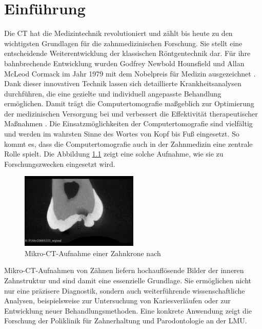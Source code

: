\chapter{Einführung}
\label{chap:einleitung} Die \ac{CT} hat die Medizintechnik revolutioniert und
zählt bis heute zu den wichtigsten Grundlagen für die zahnmedizinischen
Forschung. Sie stellt eine entscheidende Weiterentwicklung der klassischen Röntgentechnik
dar. Für ihre bahnbrechende Entwicklung wurden Godfrey Newbold Hounsfield und
Allan McLeod Cormack im Jahr 1979 mit dem Nobelpreis für Medizin ausgezeichnet
\citep[vgl.][S.~12]{handels2000}. Dank dieser innovativen Technik lassen sich
detaillierte Krankheitsanalysen durchführen, die eine gezielte und individuell angepasste
Behandlung ermöglichen. Damit trägt die Computertomografie maßgeblich zur
Optimierung der medizinischen Versorgung bei und verbessert die Effektivität
therapeutischer Maßnahmen \citep[vgl.][S.~207]{de20083d}. Die
Einsatzmöglichkeiten der Computertomografie sind vielfältig und werden im
wahrsten Sinne des Wortes von Kopf bis Fuß eingesetzt. So kommt es, dass die
Computertomografie auch in der Zahnmedizin eine zentrale Rolle spielt. Die Abbildung
\ref{fig:ct_aufnahme_eines_zahns} zeigt eine solche Aufnahme, wie sie zu
Forschungszwecken eingesetzt wird.

\begin{figure}[h]
	\centering
	\includegraphics[width=0.5\textwidth]{img/micro_ct_orginal.jpg}
	\caption{Mikro-CT-Aufnahme einer Zahnkrone nach \citet{heck2024}}
	\label{fig:ct_aufnahme_eines_zahns}
\end{figure}

Mikro-\ac{CT}-Aufnahmen von Zähnen liefern hochauflösende Bilder der inneren
Zahnstruktur und sind damit eine essenzielle Grundlage. Sie ermöglichen nicht nur
eine präzisere Diagnostik, sondern auch weiterführende wissenschaftliche
Analysen, beispielsweise zur Untersuchung von Kariesverläufen oder zur Entwicklung
neuer Behandlungsmethoden. Eine konkrete Anwendung zeigt die Forschung der
Poliklinik für Zahnerhaltung und Parodontologie an der \ac{LMU}.

